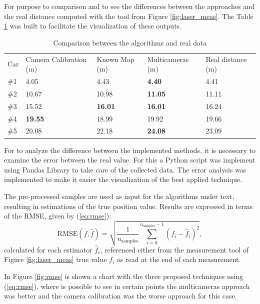 For purpose to comparison and to see the differences between the approaches and the real distance computed with the tool from Figure \ref{fig:laser_meas}. The Table \ref{tab:total} was built to facilitate the visualization of these outputs. 


\begin{table}[H]
\centering
\caption{Comparison between the algorithms and real data}
\begin{tabular}{l|l|l|l|l} 
\toprule
Car & Camera Calibration (m) & Known Map (m) & Multicameras (m) & Real distance (m) \\
\#1   & 4.05          & 4.43           & \textbf{4.40 }          & 4.41 \\
\#2   & 10.67         & 10.98          & \textbf{11.05 }         & 11.11\\
\#3   & 15.52         & \textbf{16.01}          &\textbf{ 16.01 }         & 16.24\\
\#4   & \textbf{19.55}         & 18.99          & 19.92          & 19.66\\
\#5   & 20.08         & 22.18          & \textbf{24.08}          & 23.09\\
\bottomrule
\end{tabular}
\label{tab:total}
\end{table} 

For to analyze the difference between the implemented methods, it is necessary to examine the error between the real value. For this a Python script was implement using Pandas Library \cite{mckinney2011pandas} to take care of the collected data. The error analysis was implemented to make it easier the visualization of the best applied technique. 

The pre-processed samples are used as input for the algorithms under text, resulting in estimations of the true position value. Results are expressed in terms of the RMSE, given by (\ref{eq:rmse}):
%
\begin{equation} \label{eq:rmse}
\text{RMSE}(f, \hat{f}) = \sqrt{\frac{1}{n_\text{samples}} \sum_{i=0}^{n_\text{samples} - 1} (f_i - \hat{f}_i)^2},
\end{equation}
%
calculated for each estimator $\hat{f}_i$, referenced either from the measurement tool of Figure \ref{fig:laser_meas} true value $f_i$ as read at the end of each measurement.

In Figure \ref{fig:rmse} is shown a chart with the three proposed techniques using (\ref{eq:rmse}), where is possible to see in certain points the multicameras approach was better and the camera calibration was the worse approach for this case. 

